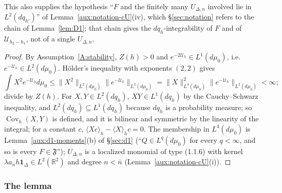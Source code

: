 \documentclass[11pt,a4paper]{article}
\theoremstyle{plain}
\theoremstyle{definition}
\theoremstyle{plain}
\theoremstyle{definition}
\newcommand{\R}{\mathbb{R}}
\DeclareMathOperator{\Cov}{Cov}
\newcommand{\ev}[2]{\langle #1\rangle_{#2}}            %
\newcommand{\Uc}{\mathcal U}
\newcommand{\dmu}{d\mu_0}
\begin{document}
This also supplies the hypothesis ``$F$ and the finitely many $U_{\Delta,n}$ involved lie in
$L^2(dq_{h'})$'' of Lemma~\ref{aux:notation-cU}(iv), which \S\ref{sec:notation} refers to the
chain of Lemma~\ref{lem:D1}; that chain gives the $dq_h$-integrability of $F$ and of
$\Uc_{h_2-h_1}$, not of a single $U_{\Delta,n}$.

\begin{proof}
By Assumption~\ref{A:stability}, $Z(h)>0$ and $e^{-2\Uc_h}\in L^1(\dmu)$, i.e.\
$e^{-\Uc_h}\in L^2(\dmu)$.  H\"older's inequality with exponents $(2,2)$ gives
\[
 \int X^2e^{-\Uc_h}\dmu\le\|X^2\|_{L^2(\dmu)}\|e^{-\Uc_h}\|_{L^2(\dmu)}
 =\|X\|_{L^4(\dmu)}^2\|e^{-\Uc_h}\|_{L^2(\dmu)}<\infty ;
\]
divide by $Z(h)$.  For $X,Y\in L^2(dq_h)$, $XY\in L^1(dq_h)$
by the Cauchy--Schwarz inequality, and $L^2(dq_h)\subseteq L^1(dq_h)$ because $dq_h$ is a
probability measure; so $\Cov_h(X,Y)$ is defined, and it is bilinear and symmetric by the
linearity of the integral; for a constant $c$, $\ev{Xc}{h}-\ev{X}{h}c=0$.  The membership in
$L^4(\dmu)$ is Lemma~\ref{aux:d1-moments}(b) of \S\ref{sec:d1} (``$Q\in L^q(\dmu)$ for every
$q<\infty$, and so is every $F\in\mathfrak F$''); $U_{\Delta,n}$ is a localized monomial of type
(1.1.6) with kernel $\lambda a_nh\mathbf 1_\Delta\in L^2(\R^2)$ and degree $n<\bar n$
(Lemma~\ref{aux:notation-cU}(i)).
\end{proof}

\subsubsection{The lemma}\label{sub:d2-lemma}
\end{document}
